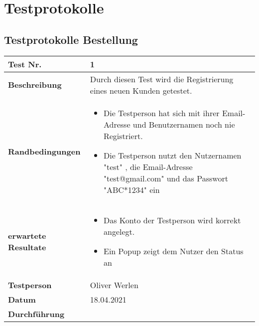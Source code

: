 \section{Testprotokolle}\label{Testprotokolle}

\subsection{Testprotokolle Bestellung}\label{testprotokolleBestellung}

\begin{table}[H]
    \setlength\extrarowheight{2pt} %
    \begin{tabularx}{\textwidth}{|l|X|}
        \hline
        \textbf{Test Nr.} & 1 \\
        \hline
        \textbf{Beschreibung} & Durch diesen Test wird die Registrierung eines neuen Kunden getestet. \\
        \hline
        \textbf{Randbedingungen} &
        \begin{minipage}[t]{0.6\textwidth}
            \begin{itemize}
                \item Die Testperson hat sich mit ihrer Email-Adresse und Benutzernamen noch nie Registriert.
                \item Die Testperson nutzt den Nutzernamen "test" , die Email-Adresse "test@gmail.com" und das Passwort "ABC*1234" ein
            \end{itemize}
        \end{minipage} \\
        \hline
        \textbf{erwartete Resultate}  &
        \begin{minipage}[t]{0.6\textwidth}
            \begin{itemize}
                \item Das Konto der Testperson wird korrekt angelegt. 
                \item Ein Popup zeigt dem Nutzer den Status an
            \end{itemize}
        \end{minipage} \\
        \hline
        \textbf{Testperson} & Oliver Werlen \\
        \hline
        \textbf{Datum} & 18.04.2021 \\
        \hline
        \textbf{Durchführung} &
        \begin{minipage}[t]{0.6\textwidth}

\end{minipage}
\end{tabularx}
\end{table}
